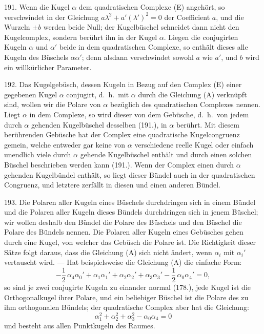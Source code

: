 191. Wenn die Kugel $\alpha$ dem quadratischen Complexe (E)
angeh\"ort, so verschwindet in der Gleichung $a\lambda^2 + a'(\lambda')^2 = 0$
der Coefficient $a$, und die Wurzeln $\pm b$ werden beide Null; der
Kugelb\"uschel schneidet dann nicht den Kugelcomplex, sondern
{\glqq}ber\"uhrt{\grqq} ihn in der Kugel $\alpha$. Liegen die conjugirten Kugeln $\alpha$
und $\alpha'$ beide in dem quadratischen Complexe, so enth\"alt dieses
alle Kugeln des B\"uschels $\alpha\alpha'$; denn alsdann verschwindet
sowohl $a$ wie $a'$, und $b$ wird ein willk\"urlicher Parameter.

192. Das Kugelgeb\"usch, dessen Kugeln in Bezug auf
den Complex (E) einer gegebenen Kugel $\alpha$ conjugirt, d.~h.\ mit
$\alpha$ durch die Gleichung (A) verkn\"upft sind, wollen wir
die {\glqq}Polare{\grqq} von $\alpha$ bez\"uglich des quadratischen Complexes
nennen. Liegt $\alpha$ in dem Complexe, so wird dieser von dem
Geb\"usche, d.~h.\ von jedem durch $\alpha$ gehenden Kugelb\"uschel desselben
(191.), in $\alpha$ {\glqq}ber\"uhrt{\grqq}. Mit diesem ber\"uhrenden Geb\"usche
hat der Complex eine quadratische Kugelcongruenz gemein,
welche entweder gar keine von $\alpha$ verschiedene reelle Kugel
oder einfach unendlich viele durch $\alpha$ gehende Kugelb\"uschel
enth\"alt und durch einen solchen B\"uschel beschrieben werden
kann (191.). Wenn der Complex einen durch $\alpha$ gehenden
Kugelb\"undel enth\"alt, so liegt dieser B\"undel auch in der
quadratischen Congruenz, und letztere zerf\"allt in diesen und
einen anderen B\"undel.


193. Die Polaren aller Kugeln eines B\"uschels durchdringen
sich in einem B\"undel und die Polaren aller Kugeln
dieses B\"undels durchdringen sich in jenem B\"uschel; wir
wollen deshalb den B\"undel die {\glqq}Polare{\grqq} des B\"uschels und
den B\"uschel die Polare des B\"undels nennen. Die Polaren
aller Kugeln eines Geb\"usches gehen durch eine Kugel, von
welcher das Geb\"usch die Polare ist. Die Richtigkeit dieser
S\"atze folgt daraus, dass die Gleichung (A) sich nicht \"andert,
wenn $\alpha_i$ mit $\alpha_i'$ vertauscht wird. --- Hat beispielsweise die
Gleichung (A) die einfache Form:
\[
-\frac{1}{2}\,\alpha_4\alpha_0' + \alpha_1\alpha_1' + \alpha_2\alpha_2'
+ \alpha_3\alpha_3' - \frac{1}{2}\,\alpha_0\alpha_4' = 0,
\]
so sind je zwei conjugirte Kugeln zu einander normal (178.),
jede Kugel ist die Orthogonalkugel ihrer Polare, und ein
beliebiger B\"uschel ist die Polare des zu ihm orthogonalen
B\"undels; der quadratische Complex aber hat die Gleichung:
\[
\alpha_1^2 + \alpha_2^2 + \alpha_3^2 - \alpha_0\alpha_4 =0
\]
und besteht aus allen Punktkugeln des Raumes.

